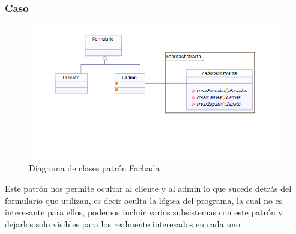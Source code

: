 \subsubsection{Caso}
\begin{figure}[h!]
	\centering
	\includegraphics[width=1.0\linewidth]{arquitectura/imagenes/DiagramaFachada}
	\caption{Diagrama de clases patrón Fachada}
\end{figure}



Este patrón nos permite ocultar al cliente y al admin lo que sucede detrás del formulario que utilizan, es decir oculta la lógica del programa, la cual no es interesante para ellos, podemos incluir varios subsistemas con este patrón y dejarlos solo visibles para los realmente interesados en cada uno.

\newpage